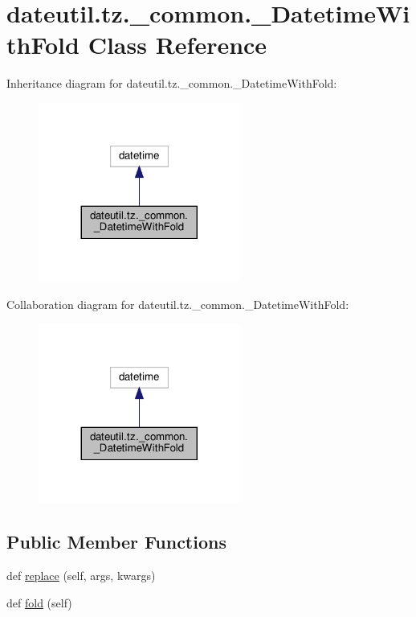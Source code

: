 \hypertarget{classdateutil_1_1tz_1_1__common_1_1__DatetimeWithFold}{}\section{dateutil.\+tz.\+\_\+common.\+\_\+\+Datetime\+With\+Fold Class Reference}
\label{classdateutil_1_1tz_1_1__common_1_1__DatetimeWithFold}


Inheritance diagram for dateutil.\+tz.\+\_\+common.\+\_\+\+Datetime\+With\+Fold\+:
\nopagebreak
\begin{figure}[H]
\begin{center}
\leavevmode
\includegraphics[width=188pt]{classdateutil_1_1tz_1_1__common_1_1__DatetimeWithFold__inherit__graph}
\end{center}
\end{figure}


Collaboration diagram for dateutil.\+tz.\+\_\+common.\+\_\+\+Datetime\+With\+Fold\+:
\nopagebreak
\begin{figure}[H]
\begin{center}
\leavevmode
\includegraphics[width=188pt]{classdateutil_1_1tz_1_1__common_1_1__DatetimeWithFold__coll__graph}
\end{center}
\end{figure}
\subsection*{Public Member Functions}
\begin{DoxyCompactItemize}
\item 
def \hyperlink{classdateutil_1_1tz_1_1__common_1_1__DatetimeWithFold_acf169cf4f46f72cf2a112ccb3e9c4bc1}{replace} (self, args, kwargs)
\item 
def \hyperlink{classdateutil_1_1tz_1_1__common_1_1__DatetimeWithFold_a2b99810ebbdb187d83b95be6c69bcbf5}{fold} (self)
\end{DoxyCompactItemize}


